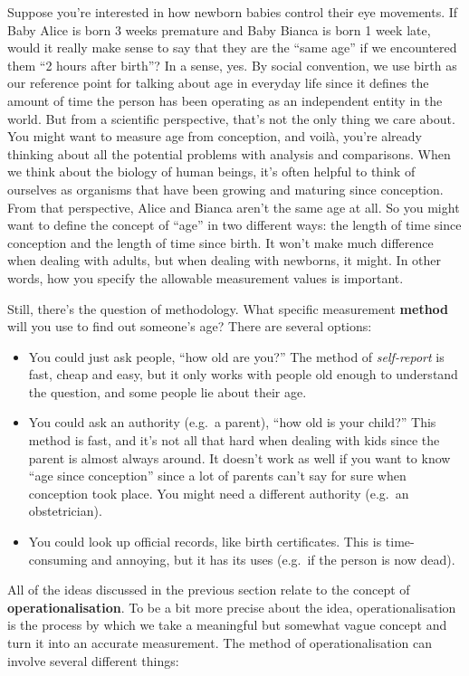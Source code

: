 \documentclass[
  11pt,
  a4paper,
  twoside,symmetric,openright]{book}
\providecommand{\tightlist}{%
  \setlength{\itemsep}{0pt}\setlength{\parskip}{0pt}}
\theoremstyle{break}
\theoremstyle{break}
\begin{document}
Suppose you're interested in how newborn babies control their eye movements. If Baby Alice is born 3 weeks premature and Baby Bianca is born 1 week late, would it really make sense to say that they are the ``same age'' if we encountered them ``2 hours after birth''? In a sense, yes. By social convention, we use birth as our reference point for talking about age in everyday life since it defines the amount of time the person has been operating as an independent entity in the world. But from a scientific perspective, that's not the only thing we care about. You might want to measure age from conception, and voilà, you're already thinking about all the potential problems with analysis and comparisons. When we think about the biology of human beings, it's often helpful to think of ourselves as organisms that have been growing and maturing since conception. From that perspective, Alice and Bianca aren't the same age at all. So you might want to define the concept of ``age'' in two different ways: the length of time since conception and the length of time since birth. It won't make much difference when dealing with adults, but when dealing with newborns, it might. In other words, how you specify the allowable measurement values is important.

Still, there's the question of methodology. What specific measurement \textbf{method} will you use to find out someone's age? There are several options:

\begin{itemize}
\tightlist
\item
  You could just ask people, ``how old are you?'' The method of \emph{self-report} is fast, cheap and easy, but it only works with people old enough to understand the question, and some people lie about their age.
\item
  You could ask an authority (e.g.~a parent), ``how old is your child?'' This method is fast, and it's not all that hard when dealing with kids since the parent is almost always around. It doesn't work as well if you want to know ``age since conception'' since a lot of parents can't say for sure when conception took place. You might need a different authority (e.g.~an obstetrician).
\item
  You could look up official records, like birth certificates. This is time-consuming and annoying, but it has its uses (e.g.~if the person is now dead).
\end{itemize}

All of the ideas discussed in the previous section relate to the concept of \textbf{operationalisation}. To be a bit more precise about the idea, operationalisation is the process by which we take a meaningful but somewhat vague concept and turn it into an accurate measurement. The method of operationalisation can involve several different things:
\end{document}
